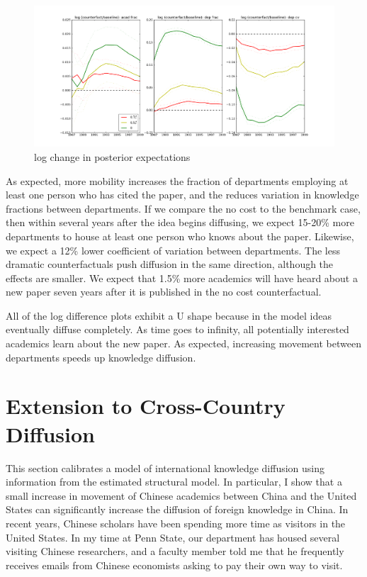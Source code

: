 \begin{figure}[!ht]
    \includegraphics[scale=0.35]{pics/sim_plots_cf_frac.png}
    \caption{log change in posterior expectations}
    \label{fig:cf_frac}
\end{figure}

As expected, more mobility increases the fraction of departments employing at least one person who has
cited the paper, and the reduces variation in knowledge fractions between departments. 
If we compare the no cost to the benchmark
case, then within several years after the idea begins diffusing, we expect 15-20\% more
departments to house at least one person who knows about the paper.
Likewise, we expect a 12\% lower coefficient of variation between departments. 
The less dramatic counterfactuals push diffusion
 in the same direction, although the effects are smaller. We expect that 1.5\% more academics will have heard about a 
 new paper seven years after it is published in the no cost counterfactual. 

 All of the log difference plots exhibit a U shape because in the model ideas eventually diffuse completely.  
 As time goes to infinity, all potentially interested academics learn about the new paper. 
 As expected, increasing movement between departments speeds up knowledge diffusion.

\section{Extension to Cross-Country Diffusion}

This section calibrates a model of international knowledge diffusion using 
information from the estimated structural model.  In particular, I show that
a small increase in movement of Chinese academics between China and the United
States can significantly increase the diffusion of foreign knowledge in China.
In recent years, Chinese scholars have been spending more time as visitors in 
the United States.  In my time at Penn State, our department has housed several
visiting Chinese researchers, and a faculty member told me that he frequently receives 
emails from Chinese economists asking to pay their own way to visit.

